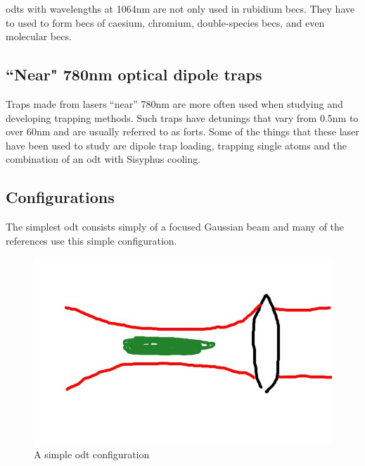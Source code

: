 \glspl{odt} with wavelengths at 1064nm are not only used in rubidium \glspl{bec}. They have to used to form \glspl{bec} of caesium\cite{hung_accelerating_2008}, chromium\cite{beaufils_all-optical_2008}, double-species \glspl{bec}\cite{thalhammer_double_2008}, and even molecular \glspl{bec}\cite{zwierlein_observation_2003}.

\subsection{``Near" 780nm optical dipole traps}
Traps made from lasers ``near'' 780nm are more often used when studying and developing trapping methods. Such traps have detunings that vary from 0.5nm\cite{miller_rf-induced_2002} to over 60nm\cite{miller_far-off-resonance_1993, weber_analysis_2006} and are usually referred to as \glspl{fort}. Some of the things that these laser have been used to study are dipole trap loading\cite{kuppens_loading_2000}, trapping single atoms\cite{weber_analysis_2006} and the combination of an \gls{odt} with Sisyphus cooling\cite{miller_rf-induced_2002}.

\subsection{Configurations}
The simplest \gls{odt} consists simply of a focused Gaussian beam\cite{chu_experimental_1986} and many of the references use this simple configuration.

\begin{figure}[h]
	\centering
	\includegraphics[scale=0.32]{figs/simpledipoletrap.jpg}
	\caption[Title]{A simple \gls{odt} configuration}
	\label{figs/MOT.pdf}
\end{figure}

